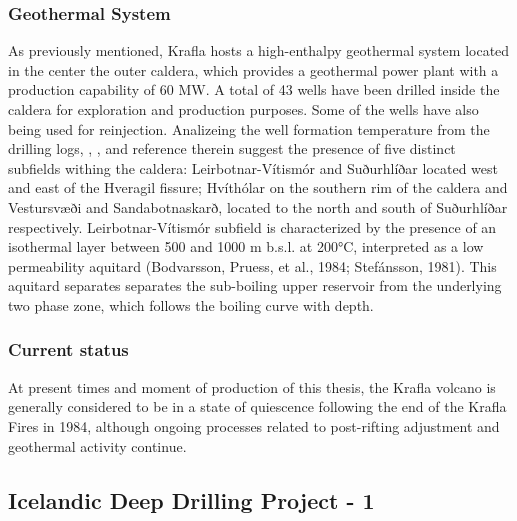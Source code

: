 \subsubsection{Geothermal System}
As previously mentioned, Krafla hosts a high-enthalpy geothermal system located in the center the outer caldera, which provides a geothermal power plant with a production capability of 60 MW. 
A total of 43 wells have been drilled inside the caldera for exploration and production purposes. Some of the wells have also being used for reinjection. Analizeing the well formation temperature from the drilling logs, \cite{mortesen2015}, \cite{arnason2020}, \cite{scott2022} and reference therein suggest the presence of five distinct subfields withing the caldera: Leirbotnar-Vítismór and Suðurhlíðar located west and east of the Hveragil fissure; Hvíthólar on the southern rim of the caldera and Vestursvæði and Sandabotnaskarð, located to the north and south of Suðurhlíðar respectively. 
Leirbotnar-Vítismór subfield is characterized by the presence of an isothermal layer between 500 and 1000 m b.s.l. at 200°C, interpreted as a low permeability aquitard (Bodvarsson, Pruess, et al., 1984; Stefánsson, 1981). This aquitard separates separates the sub-boiling upper reservoir from the underlying two phase zone, which follows the boiling curve with depth.


\subsubsection{Current status}
At present times and moment of production of this thesis, the Krafla volcano is generally considered to be in a state of quiescence following the end of the Krafla Fires in 1984, although ongoing processes related to post-rifting adjustment and geothermal activity continue. 

\subsection{Icelandic Deep Drilling Project - 1}


